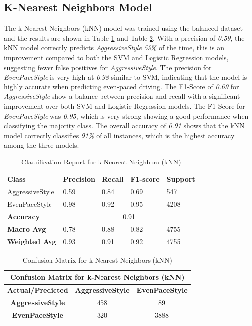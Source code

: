 \documentclass[10pt,journal,compsoc]{IEEEtran}
\begin{document}
\subsection{K-Nearest Neighbors Model}
The k-Nearest Neighbors (kNN) model was trained using the balanced dataset and the results are shown in Table \ref{table:knn_classification_report} and Table \ref{table:knn_confusion_matrix}.
With a precision of \textit{0.59}, the kNN model correctly predicts \textit{AggressiveStyle} \textit{59\%} of the time, this is an improvement compared to both the SVM and Logistic Regression models, 
suggesting fewer false positives for \textit{AggressiveStyle}. The precision for \textit{EvenPaceStyle} is very high at \textit{0.98} similar to SVM, indicating that the model is highly accurate when predicting even-paced driving.
The F1-Score of \textit{0.69} for \textit{AggressiveStyle} show a balance between precision and recall with a significant improvement over both SVM and Logistic Regression models. The F1-Score for \textit{EvenPaceStyle} 
was \textit{0.95}, which is very strong showing a good performance when classifying the majority class. The overall accuracy of \textit{0.91} shows that the kNN model correctly classifies \textit{91\%} of all instances, which is 
the highest accuracy among the three models.

\begin{table}[h]
    \centering    
    \begin{tabular}{|l|l|l|l|l|}
    \hline
    \textbf{Class} & \textbf{Precision} & \textbf{Recall} & \textbf{F1-score} & \textbf{Support} \\ \hline
    AggressiveStyle & 0.59 & 0.84 & 0.69 & 547 \\ \hline
    EvenPaceStyle & 0.98 & 0.92 & 0.95 & 4208 \\ \hline
    \textbf{Accuracy} & \multicolumn{4}{c|}{0.91} \\ \hline
    \textbf{Macro Avg} & 0.78 & 0.88 & 0.82 & 4755 \\ \hline
    \textbf{Weighted Avg} & 0.93 & 0.91 & 0.92 & 4755 \\ \hline
    \end{tabular}
    \caption{Classification Report for k-Nearest Neighbors (kNN)}
    \label{table:knn_classification_report}
\end{table}


\begin{table}[h]
    \centering
    \begin{tabular}{|c|c|c|}
    \hline
    \multicolumn{3}{|c|}{\textbf{Confusion Matrix for k-Nearest Neighbors (kNN)}} \\
    \hline
    \textbf{Actual/Predicted} & \textbf{AggressiveStyle} & \textbf{EvenPaceStyle} \\ \hline
    \textbf{AggressiveStyle} & 458 & 89 \\ \hline
    \textbf{EvenPaceStyle} & 320 & 3888 \\ \hline
    \end{tabular}
    \caption{Confusion Matrix for k-Nearest Neighbors (kNN)}
    \label{table:knn_confusion_matrix}
\end{table}
\end{document}
